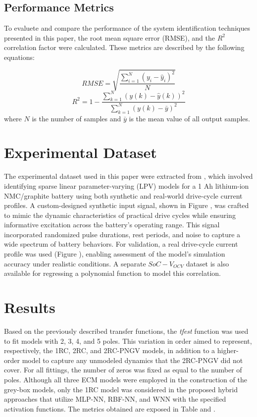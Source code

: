 \documentclass[lettersize,journal]{IEEEtran}
\begin{document}
\subsection{Performance Metrics}

To evaluete and compare the performance of the system identification techniques presented in this paper, the root mean square error (RMSE), and the $R^2$ correlation factor were calculated. These metrics are described by the following equations:

\begin{equation}
	RMSE = \sqrt{\frac{\sum_{i=1}^{N}(y_i-\hat{y}_i)^2}{N}}
\end{equation}
\begin{equation}
	R^2 = 1-\frac{\sum_{k=1}^N(y(k)-\hat{y}(k))^2}{\sum_{k=1}^N(y(k)-\bar{y})^2}
\end{equation}
where $N$ is the number of samples and $\bar{y}$ is the mean value of all output samples.


\section{Experimental Dataset}

The experimental dataset used in this paper were extracted from \cite{Sheikh2024}, which involved identifying sparse linear parameter-varying (LPV) models for a 1 Ah lithium-ion NMC/graphite battery using both synthetic and real-world drive-cycle current profiles. A custom-designed synthetic input signal, shown in Figure , was crafted to mimic the dynamic characteristics of practical drive cycles while ensuring informative excitation across the battery’s operating range. This signal incorporated randomized pulse durations, rest periods, and noise to capture a wide spectrum of battery behaviors. For validation, a real drive-cycle current profile was used (Figure ), enabling assessment of the model’s simulation accuracy under realistic conditions. A separate $SoC-V_{OCV}$ dataset is also available for regressing a polynomial function to model this correlation.

\section{Results}

Based on the previously described transfer functions, the \textit{tfest} function was used to fit models with 2, 3, 4, and 5 poles. This variation in order aimed to represent, respectively, the 1RC, 2RC, and 2RC-PNGV models, in addition to a higher-order model to capture any unmodeled dynamics that the 2RC-PNGV did not cover. For all fittings, the number of zeros was fixed as equal to the number of poles. Although all three ECM models were employed in the construction of the grey-box models, only the 1RC model was considered in the proposed hybrid approaches that utilize MLP-NN, RBF-NN, and WNN with the specified activation functions. The metrics obtained are exposed in Table and .
\end{document}
